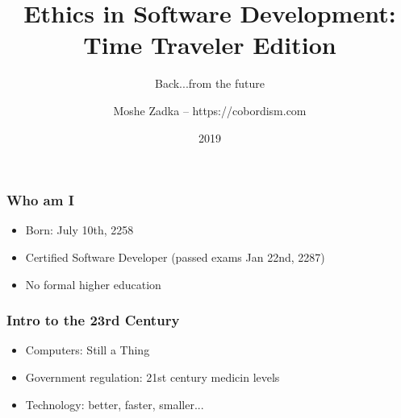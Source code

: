 \usepackage{graphicx}
\usepackage{listings}
\usepackage{textcomp}
\usepackage{fancyvrb}

\title{Ethics in Software Development: Time Traveler Edition}
\subtitle{Back...from the future}
\author{Moshe Zadka -- https://cobordism.com}
\date{2019}


\begin{titlepage}
\maketitle
\end{titlepage}

\frame{\titlepage}

\begin{frame}[fragile]
\frametitle{Who am I}

\begin{itemize}
\item Born: July 10th, 2258
\item Certified Software Developer (passed exams Jan 22nd, 2287)
\item No formal higher education
\end{itemize}

\end{frame}

\begin{frame}[fragile]
\frametitle{Intro to the 23rd Century}

\begin{itemize}
\item Computers: Still a Thing
\item Government regulation: 21st century medicin levels
\item Technology: better, faster, smaller...
\end{itemize}

\end{frame}

